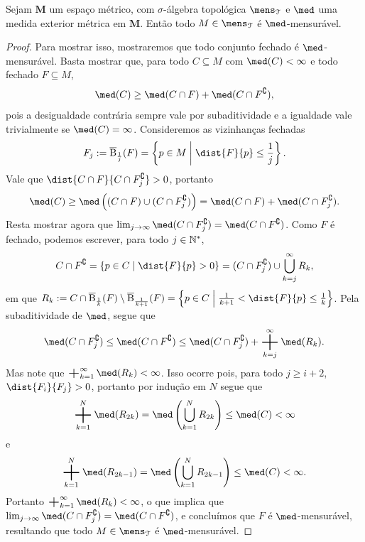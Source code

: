 \begin{prop}
\label{prop:criterio.mensur.med.metrica}
Sejam $\bm M$ um espaço métrico, com $\sigma$-álgebra topológica $\mens_\topo$ e $\med$ uma medida exterior métrica em $\bm M$. Então todo $M \in \mens_\topo$ é $\med$-mensurável.
\end{prop}
\begin{proof}
Para mostrar isso, mostraremos que todo conjunto fechado é $\med$-mensurável. Basta mostrar que, para todo $C \subseteq M$ com $\med(C) < \infty$ e todo fechado $F \subseteq M$,
	\begin{equation*}
	\med(C) \geq \med(C \cap F) + \med(C \cap F^\complement),
	\end{equation*}
pois a desigualdade contrária sempre vale por subaditividade e a igualdade vale trivialmente se $\med(C) = \infty$. Consideremos as vizinhanças fechadas
	\begin{equation*}
	F_j := \overline\bola_{\frac{1}{j}}(F) = \set{p \in M}{\dist{F}{p} \leq \frac{1}{j}}.
	\end{equation*}
Vale que $\dist{C \cap F}{C \cap F_j^\complement} > 0$, portanto
	\begin{equation*}
	\med(C) \geq \med\left( (C \cap F) \cup (C \cap F_j^\complement) \right) = \med(C \cap F) + \med(C \cap F_j^\complement).
	\end{equation*}
Resta mostrar agora que $\lim_{j \conv \infty} \med(C \cap F_j^\complement) = \med(C \cap F^\complement)$. Como $F$ é fechado, podemos escrever, para todo $j \in \mathbb{N}^*$,
	\begin{equation*}
	C \cap F^\complement = \set{p \in C}{\dist{F}{p} > 0} = (C \cap F_j^\complement) \cup \bigcup_{k=j}^\infty R_k,
	\end{equation*}
em que $R_k := C \cap \overline\bola_{\frac{1}{k}}(F) \setminus \overline\bola_{\frac{1}{k+1}}(F) = \set{p \in C}{\frac{1}{k+1} < \dist{F}{p} \leq \frac{1}{k}}$. Pela subaditividade de $\med$, segue que
	\begin{equation*}
	\med(C \cap F_j^\complement) \leq \med(C \cap F^\complement) \leq \med(C \cap F_j^\complement) + \sum_{k=j}^\infty \med(R_k).
	\end{equation*}
Mas note que $\sum_{k=1}^\infty \med(R_k) < \infty$. Isso ocorre pois, para todo $j \geq i+2$, $\dist{F_i}{F_j} > 0$, portanto por indução em $N$ segue que
	\begin{equation*}
	\sum_{k=1}^N \med(R_{2k}) = \med\left( \bigcup_{k=1}^N R_{2k} \right) \leq \med(C) < \infty
	\end{equation*}
e
	\begin{equation*}
	\sum_{k=1}^N \med(R_{2k-1}) = \med\left( \bigcup_{k=1}^N R_{2k-1} \right) \leq \med(C) < \infty.
	\end{equation*}
Portanto $\sum_{k=1}^\infty \med(R_k) < \infty$, o que implica que $\lim_{j \conv \infty} \med(C \cap F_j^\complement) = \med(C \cap F^\complement)$, e concluímos que $F$ é $\med$-mensurável, resultando que todo $M \in \mens_\topo$ é $\med$-mensurável.
\end{proof}

